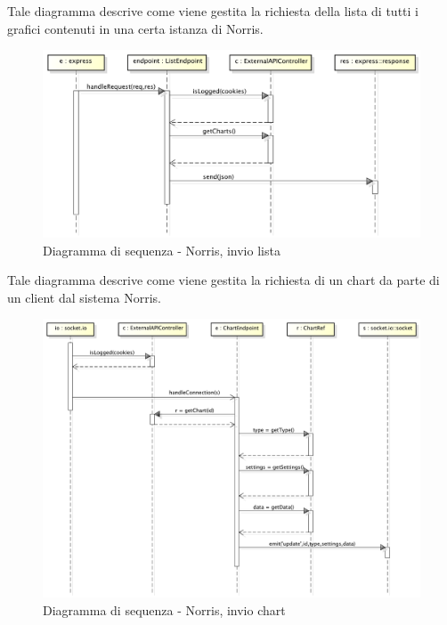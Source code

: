             
        	Tale diagramma descrive come viene gestita la richiesta della lista di tutti i grafici contenuti in una certa istanza di Norris.
            \begin{figure}[H]
                \centering
                \includegraphics[scale=0.3]{DefinizioneDiProdotto/Pics/NorrisInvioLista}
                \caption{Diagramma di sequenza - Norris, invio lista}
            \end{figure}

            
        	Tale diagramma descrive come viene gestita la richiesta di un chart da parte di un client dal sistema Norris.
            \begin{figure}[H]
                \centering
                \includegraphics[scale=0.3]{DefinizioneDiProdotto/Pics/NorrisInvioChart}
                \caption{Diagramma di sequenza - Norris, invio chart}
            \end{figure}
